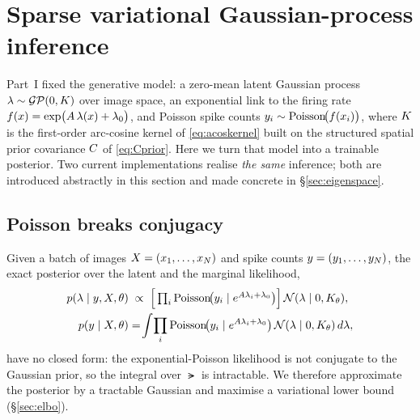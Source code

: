 
\begingroup\sloppy

\section{Sparse variational Gaussian-process inference}\label{sec:varinf}

Part~I fixed the generative model: a zero-mean latent Gaussian process
$\lambda \sim \mathcal{GP}(0,K)$ over image space, an exponential link to the firing
rate $f(x)=\exp\!\big(A\,\lambda(x)+\lambda_{0}\big)$, and Poisson spike counts
$y_i \sim \mathrm{Poisson}\!\big(f(x_i)\big)$, where $K$ is the first-order
arc-cosine kernel of \eqref{eq:acoskernel} built on the structured spatial
prior covariance $C$ of \eqref{eq:Cprior}. Here we turn that model into a
trainable posterior. Two current implementations realise \emph{the same}
inference; both are introduced abstractly in this section and made concrete in
\S\ref{sec:eigenspace}.

\subsection{Poisson breaks conjugacy}\label{sec:conjugacy}

Given a batch of images $X=(x_1,\dots,x_{N})$ and spike counts
$y=(y_1,\dots,y_{N})$, the exact posterior over the latent and the
marginal likelihood,
\begin{align}
  p(\lambda\mid y,X,\theta)&\;\propto\;
    \Big[\textstyle\prod_i \mathrm{Poisson}\!\big(y_i\mid e^{A\lambda_i+\lambda_{0}}\big)\Big]\,
    \mathcal{N}(\lambda\mid 0,K_\theta), \notag\\
  p(y\mid X,\theta)&=\!\int\! \prod_i \mathrm{Poisson}\!\big(y_i\mid e^{A\lambda_i+\lambda_{0}}\big)\,
    \mathcal{N}(\lambda\mid 0,K_\theta)\,d\lambda ,
\end{align}
have no closed form: the exponential-Poisson likelihood is not conjugate to the
Gaussian prior, so the integral over $\lat$ is intractable. We therefore
approximate the posterior by a tractable Gaussian and maximise a variational
lower bound (\S\ref{sec:elbo}).

